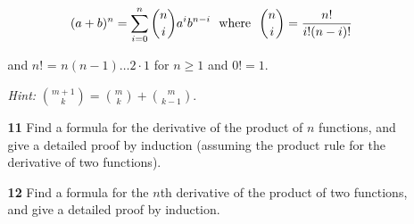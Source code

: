 \documentclass[paper=usletter, fontsize=12pt]{article}
\begin{document}
\begin{itemize}
\begin{itemize}
                \[ (a+b)^n = \sum_{i=0}^{n} \binom{n}{i}a^{i}b^{n-i} \text{\ \
                where \ } \binom{n}{i}=\frac{n!}{i!(n-i)!} \]

            and $n!$ = $n(n-1)\ldots 2 \cdot 1$ for $n \ge 1$ and $0! = 1$.

            \textit{Hint:} $\binom{m+1}{k}=\binom{m}{k}+\binom{m}{k-1}$.

            \item[\textbf{11}] Find a formula for the derivative of the product
            of $n$ functions, and give a detailed proof by induction (assuming
            the product rule for the derivative of two functions).

            \item[\textbf{12}] Find a formula for the $n$th derivative of the
            product of two functions, and give a detailed proof by induction.

        \end{itemize}

    \end{itemize}
\end{document}

